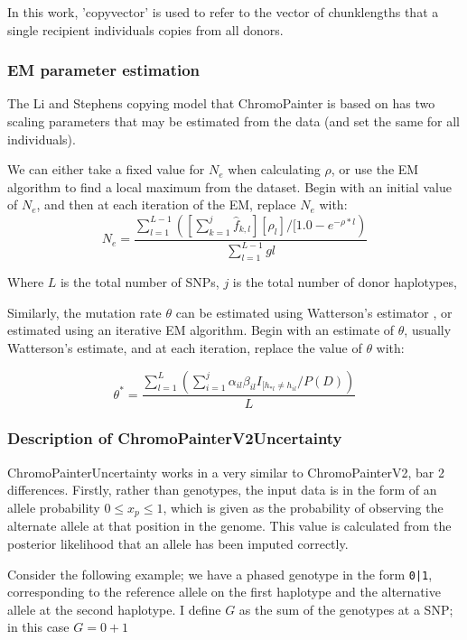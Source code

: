 In this work, 'copyvector' is used to refer to the vector of chunklengths that a single recipient individuals copies from all donors.


\subsubsection{EM parameter estimation}

The Li and Stephens copying model that ChromoPainter is based on has two scaling parameters that may be estimated from the data (and set the same for all individuals). 

We can either take a fixed value for $N_{e}$ when calculating $\rho$, or use the EM algorithm to find a local maximum from the dataset. Begin with an initial value of $N_{e}$, and then at each iteration of the EM, replace $N_{e}$ with:
\begin{equation}
N_{e} = \frac{\sum_{l=1}^{L-1}([\sum_{k=1}^{j} \hat{f}_{k,l}][\rho_{l}]/[1.0-e^{-\rho*l})}{\sum_{l=1}^{L-1} gl}
\end{equation}

Where $L$ is the total number of SNPs, $j$ is the total number of donor haplotypes, 

Similarly, the mutation rate $\theta$ can be estimated using Watterson's estimator \cite{Watterson1975}, or estimated using an iterative EM algorithm. Begin with an estimate of $\theta$, usually Watterson's estimate, and at each iteration, replace the value of $\theta$ with:

\begin{equation}
\theta^{*} = \frac{\sum_{l=1}^{L}(\sum_{i=1}^{j} \alpha_{il} \beta_{il} I_{[h_{*l} \neq h_{il}} / P(D)
)}{L}
\end{equation}

\subsubsection{Description of ChromoPainterV2Uncertainty}

ChromoPainterUncertainty works in a very similar to ChromoPainterV2, bar 2 differences. Firstly, rather than genotypes, the input data is in the form of an allele probability $0 \leq x_{p} \leq 1$, which is given as the probability of observing the alternate allele at that position in the genome. This value is calculated from the posterior likelihood that an allele has been imputed correctly. 

Consider the following example; we have a phased genotype in the form \texttt{0|1}, corresponding to the reference allele on the first haplotype and the alternative allele at the second haplotype. I define $G$ as the sum of the genotypes at a SNP; in this case $G=0+1$

